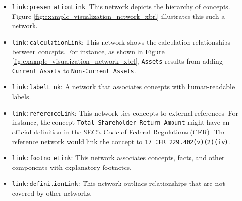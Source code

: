 \begin{itemize}
    \item \texttt{link:presentationLink}: This network depicts the hierarchy of concepts.
    Figure \ref{fig:example_visualization_network_xbrl} illustrates this such a network.
    \item \texttt{link:calculationLink}: This network shows the calculation relationships between concepts.
    For instance, as shown in Figure \ref{fig:example_visualization_network_xbrl}, 
    \texttt{Assets} results from adding \texttt{Current Assets} to \texttt{Non-Current Assets}.
    \item \texttt{link:labelLink}: A network that associates concepts with human-readable labels.
    \item \texttt{link:referenceLink}: This network ties concepts to external references.
    For instance, the concept \texttt{Total Shareholder Return Amount} might have an official definition in the SEC's Code of Federal Regulations (CFR).
    The reference network would link the concept to \texttt{17 CFR 229.402(v)(2)(iv)}\cite{cfr_total_shareholder_return_amount}.
    \item \texttt{link:footnoteLink}: This network associates concepts, facts, and other components with explanatory footnotes.
    \item \texttt{link:definitionLink}: This network outlines relationships that are not covered by other networks.
\end{itemize}



